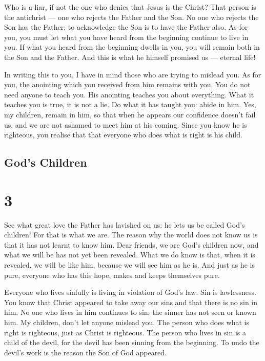  Who is a liar, if not the one who denies that Jesus is the
Christ? That person is the antichrist --- one who rejects the Father and
the Son.  No one who rejects the Son has the Father; to
acknowledge the Son is to have the Father also.  As for
you, you must let what you have heard from the beginning continue to
live in you. If what you heard from the beginning dwells in you, you
will remain both in the Son and the Father.  And this is
what he himself promised us --- eternal life!

 In writing this to you, I have in mind those who are
trying to mislead you.  As for you, the anointing which you
received from him remains with you. You do not need anyone to teach you.
His anointing teaches you about everything. What it teaches you is true,
it is not a lie. Do what it has taught you: abide in him. 
Yes, my children, remain in him, so that when he appears our confidence
doesn't fail us, and we are not ashamed to meet him at his coming.
 Since you know he is righteous, you realise that that
everyone who does what is right is his child.

\hypertarget{gods-children}{%
\subsection{God's Children}\label{gods-children}}

\hypertarget{section-2}{%
\section{3}\label{section-2}}

 See what great love the Father has lavished on us: he lets
us be called God's children! For that is what we are. The reason why the
world does not know us is that it has not learnt to know him.
 Dear friends, we are God's children now, and what we will
be has not yet been revealed. What we do know is that, when it is
revealed, we will be like him, because we will see him as he is.
 And just as he is pure, everyone who has this hope, makes
and keeps themselves pure.

 Everyone who lives sinfully is living in violation of God's
law. Sin is lawlessness.  You know that Christ appeared to
take away our sins and that there is no sin in him.  No one
who lives in him continues to sin; the sinner has not seen or known him.
 My children, don't let anyone mislead you. The person who
does what is right is righteous, just as Christ is righteous.
 The person who lives in sin is a child of the devil, for
the devil has been sinning from the beginning. To undo the devil's work
is the reason the Son of God appeared.


